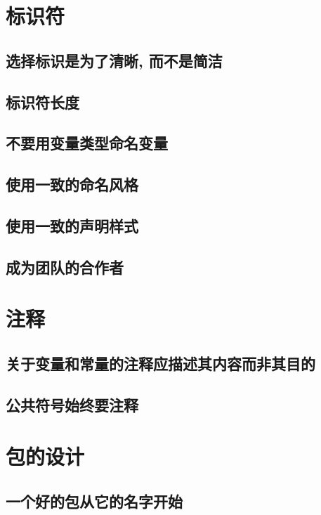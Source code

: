 \documentclass{paper}
\begin{document}
\section{标识符}

\subsection{选择标识是为了清晰, 而不是简洁}

\subsection{标识符长度}

\subsection{不要用变量类型命名变量}

\subsection{使用一致的命名风格}

\subsection{使用一致的声明样式}

\subsection{成为团队的合作者}

\section{注释}

\subsection{关于变量和常量的注释应描述其内容而非其目的 }
\subsection{公共符号始终要注释}

\section{包的设计}

\subsection{一个好的包从它的名字开始}
\end{document}
